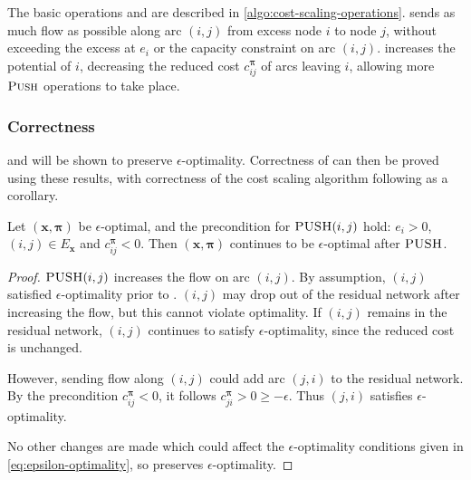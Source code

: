 The basic operations  and  are described in \cref{algo:cost-scaling-operations}.  sends as much flow as possible along arc $(i,j)$ from excess node $i$ to node $j$, without exceeding the excess at $e_i$ or the capacity constraint on arc $(i,j)$.  increases the potential of $i$, decreasing the reduced cost $c_{ij}^{\boldsymbol{\pi}}$ of arcs leaving $i$, allowing more $\textproc{Push}$ operations to take place.

\subsubsection{Correctness}

 and  will be shown to preserve $\epsilon$-optimality. Correctness of  can then be proved using these results, with correctness of the cost scaling algorithm following as a corollary.\\

\begin{lemma} \label{lemma:cost-scaling-push-correctness}
Let $\left(\mathbf{x},\boldsymbol{\pi}\right)$ be $\epsilon$-optimal, and the precondition for $\textproc{PUSH}(i,j)$ hold: $e_i > 0$, $(i,j) \in E_{\mathbf{x}}$ and $c^{\boldsymbol{\pi}}_{ij} < 0$. Then $\left(\mathbf{x},\boldsymbol{\pi}\right)$ continues to be $\epsilon$-optimal after $\textproc{PUSH}$.
\end{lemma}
\begin{proof}
$\textproc{PUSH}(i,j)$ increases the flow on arc $(i,j)$. By assumption, $(i,j)$ satisfied $\epsilon$-optimality prior to . $(i,j)$ may drop out of the residual network after increasing the flow, but this cannot violate optimality. If $(i,j)$ remains in the residual network, $(i,j)$ continues to satisfy $\epsilon$-optimality, since the reduced cost is unchanged.

However, sending flow along $(i,j)$ could add arc $(j,i)$ to the residual network. By the precondition $c^{\boldsymbol{\pi}}_{ij} < 0$, it follows $c^{\boldsymbol{\pi}}_{ji} > 0 \geq -\epsilon$. Thus $(j,i)$ satisfies $\epsilon$-optimality.

No other changes are made which could affect the $\epsilon$-optimality conditions given in \cref{eq:epsilon-optimality}, so  preserves $\epsilon$-optimality.
\end{proof}

